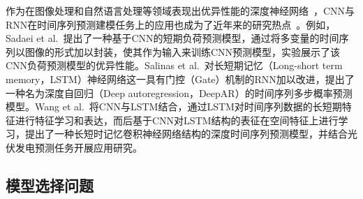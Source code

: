 作为在图像处理和自然语言处理等领域表现出优异性能的深度神经网络~\cite{alomStateoftheart2019}，CNN与RNN在时间序列预测建模任务上的应用也成为了近年来的研究热点~\cite{sezerFinancial2020,lindbergLongterm2019,mudelseeTrend2019}。例如，Sadaei et al.~\cite{sadaei2019short}提出了一种基于CNN的短期负荷预测模型，通过将多变量的时间序列以图像的形式加以封装，使其作为输入来训练CNN预测模型，实验展示了该CNN负荷预测模型的优异性能。Salinas et al.~\cite{salinasDeepAR2020}对长短期记忆（Long-short term memory，LSTM）神经网络这一具有门控（Gate）机制的RNN加以改进，提出了一种名为深度自回归（Deep autoregression，DeepAR）的时间序列多步概率预测模型。Wang et al.~\cite{wangPhotovoltaic2019}将CNN与LSTM结合，通过LSTM对时间序列数据的长短期特征进行特征学习和表达，而后基于CNN对LSTM结构的表征在空间特征上进行学习，提出了一种长短时记忆卷积神经网络结构的深度时间序列预测模型，并结合光伏发电预测任务开展应用研究。



\subsection{模型选择问题}

